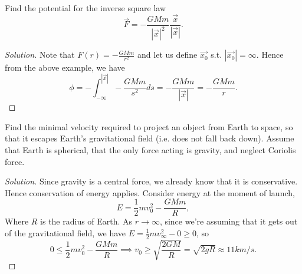 \begin{example}
  Find the potential for the inverse square law
  \[\vec{F} = -\frac{GMm}{|\vec{x}|^2} \frac{\vec{x}}{|\vec{x}|}.\]
\end{example}
\begin{proof}[Solution]
  Note that $F(r)=-\frac{GMm}{r^2}$ and let us define $\vec{x_0}$ s.t.
  $|\vec{x_0}|=\infty$. Hence from the above example, we have
  \[ \phi=- \int_{-\infty}^{|\vec{x}|}-\frac{GMm}{s^2}ds =
  -\frac{GMm}{|\vec{x}|} = -\frac{GMm}{r}.\]
\end{proof}

\begin{example}
  Find the minimal velocity required to project an object from Earth to space,
  so that it escapes Earth's gravitational field (i.e. does not fall back down).
  Assume that Earth is spherical, that the only force acting is gravity, and
  neglect Coriolis force.
\end{example}
\begin{proof}[Solution]
  Since gravity is a central force, we already know that it is conservative.
  Hence conservation of energy applies. Consider energy at the moment of launch,
  \[E=\frac{1}{2}mv_0^2 - \frac{GMm}{R},\]
  Where $R$ is the radius of Earth. As $r\to \infty$, since we're assuming that
  it gets out of the gravitational field, we have
  $E=\frac{1}{2}mv_{\infty}^2-0\geq 0$, so
  \[0\leq \frac{1}{2}mv_0^2 - \frac{GMm}{R} \implies v_0\geq
  \sqrt{\frac{2GM}{R}}= \sqrt{2gR}\approx 11 km/s.\]
\end{proof}

